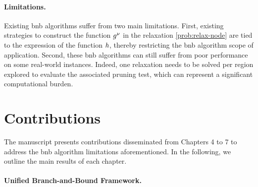 \documentclass[11pt]{article}
\begin{document}
\paragraph{Limitations.}
Existing \gls{bnb} algorithms suffer from two main limitations.
First, existing strategies to construct the function $g^\nu$ in the relaxation \eqref{prob:relax-node} are tied to the expression of the function $h$, thereby restricting the \gls{bnb} algorithm scope of application.
Second, these \gls{bnb} algorithms can still suffer from poor performance on some real-world instances.
Indeed, one relaxation needs to be solved per region explored to evaluate the associated pruning test, which can represent a significant computational burden.


\section{Contributions}
\label{sec:contributions}

The manuscript presents contributions disseminated from Chapters 4 to 7 to address the \gls{bnb} algorithm limitations aforementioned.
In the following, we outline the main results of each chapter.


\paragraph{Unified Branch-and-Bound Framework.}
\end{document}
